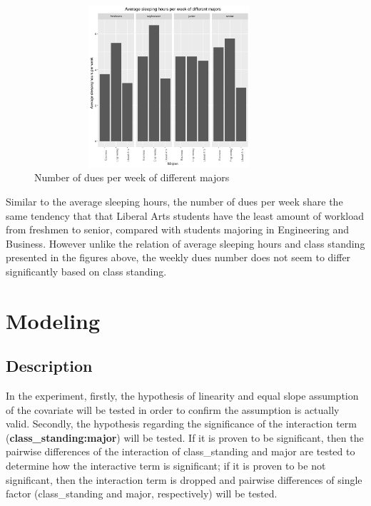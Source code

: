 \documentclass{article} %
\begin{document}
\begin{figure}[H]
	\begin{center}
		\includegraphics[height=6cm, width=10cm]{4.png}
	\end{center}
	\caption{Number of dues per week of different majors}
\end{figure}




Similar to the average sleeping hours, the number of dues per week share the same tendency that that Liberal Arts students have the least amount of workload from freshmen to senior, compared with students majoring in Engineering and Business. However unlike the relation of average sleeping hours and class standing presented in the figures above, the weekly dues number does not seem to differ significantly based on class standing.  

\section{Modeling}


\subsection{Description}

In the experiment, firstly, the hypothesis of linearity and equal slope assumption of the covariate will be tested in order to confirm the assumption is actually valid. Secondly, the hypothesis regarding the significance of the interaction term (\textbf{class\_standing:major}) will be tested. If it is proven to be significant, then the pairwise differences of the interaction of class\_standing and major are tested to determine how the interactive term is significant; if it is proven to be not significant, then the interaction term is dropped and pairwise differences of single factor (class\_standing and major, respectively) will be tested.
\end{document}
